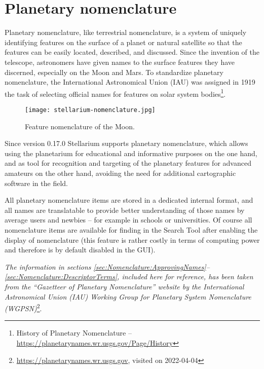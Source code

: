 
\chapter{Planetary nomenclature}
\label{ch:Nomenclature}

Planetary nomenclature, like terrestrial nomenclature, 
is a system of uniquely identifying features on the surface of a planet or 
natural satellite so that the features can be easily located, described, and discussed. 
Since the invention of the telescope, astronomers have given names to the surface 
features they have discerned, especially on the Moon and Mars. To standardize planetary 
nomenclature, the International Astronomical Union (IAU) was assigned in 1919 the task 
of selecting official names for features on solar system bodies\footnote{History of 
Planetary Nomenclature -- \url{https://planetarynames.wr.usgs.gov/Page/History}}.

\begin{figure}[ht]
\centering\texttt{[image: stellarium-nomenclature.jpg]}
\caption{Feature nomenclature of the Moon.}
\label{fig:Nomenclature:Moon}
\end{figure}

Since version 0.17.0 Stellarium supports planetary nomenclature, which allows using the 
planetarium for educational and informative purposes on the one hand, and as tool for 
recognition and targeting of the planetary features for advanced amateurs on the other 
hand, avoiding the need for additional cartographic software in the field. 

All planetary nomenclature items are stored in a dedicated internal format, 
and all names are translatable to provide better understanding of those names 
by average users and newbies -- for example in schools or universities.  
Of course all nomenclature items are available for finding in the Search Tool 
after enabling the display of nomenclature (this feature is rather costly in terms of 
computing power and therefore is by default disabled in the GUI).

\emph{The information in sections \ref{sec:Nomenclature:ApprovingNames}--\ref{sec:Nomenclature:DescriptorTerms}, 
included here for reference, has been taken from the ``Gazetteer of Planetary Nomenclature'' website 
by the International Astronomical Union (IAU) Working Group for Planetary System Nomenclature 
(WGPSN)}\footnote{\url{https://planetarynames.wr.usgs.gov}, visited on 2022-04-04}.

